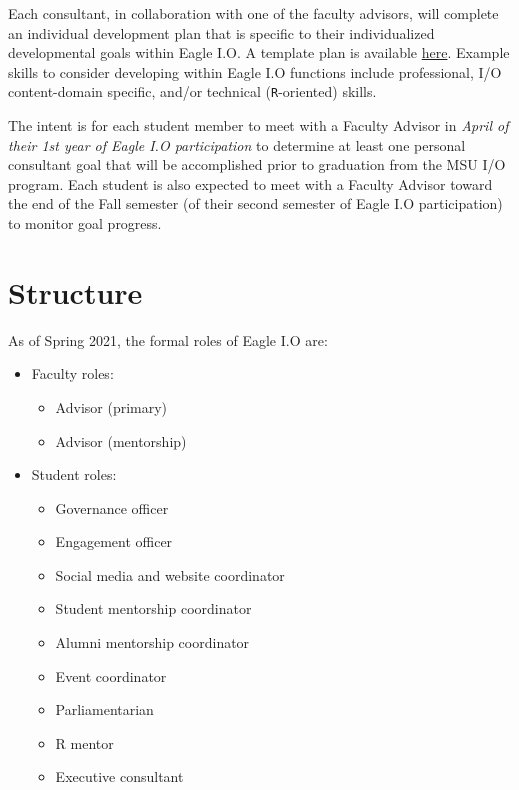 \documentclass[
]{book}
\providecommand{\tightlist}{%
  \setlength{\itemsep}{0pt}\setlength{\parskip}{0pt}}
\begin{document}
Each consultant, in collaboration with one of the faculty advisors, will complete an individual development plan that is specific to their individualized developmental goals within Eagle I.O. A template plan is available \href{https://docs.google.com/document/d/13OhBJgO4Lr40uA9s3tLBTm17TNRrQa-NJnfTIbSGmT4/edit?usp=sharing}{here}. Example skills to consider developing within Eagle I.O functions include professional, I/O content-domain specific, and/or technical (\texttt{R}-oriented) skills.

The intent is for each student member to meet with a Faculty Advisor in \emph{April of their 1st year of Eagle I.O participation} to determine at least one personal consultant goal that will be accomplished prior to graduation from the MSU I/O program. Each student is also expected to meet with a Faculty Advisor toward the end of the Fall semester (of their second semester of Eagle I.O participation) to monitor goal progress.

\hypertarget{roles}{%
\section{Structure}\label{roles}}

As of Spring 2021, the formal roles of Eagle I.O are:

\begin{itemize}
\tightlist
\item
  Faculty roles:

  \begin{itemize}
  \tightlist
  \item
    Advisor (primary)
  \item
    Advisor (mentorship)
  \end{itemize}
\item
  Student roles:

  \begin{itemize}
  \tightlist
  \item
    Governance officer
  \item
    Engagement officer
  \item
    Social media and website coordinator
  \item
    Student mentorship coordinator
  \item
    Alumni mentorship coordinator\\
  \item
    Event coordinator
  \item
    Parliamentarian
  \item
    R mentor
  \item
    Executive consultant
  \end{itemize}
\end{itemize}
\end{document}
